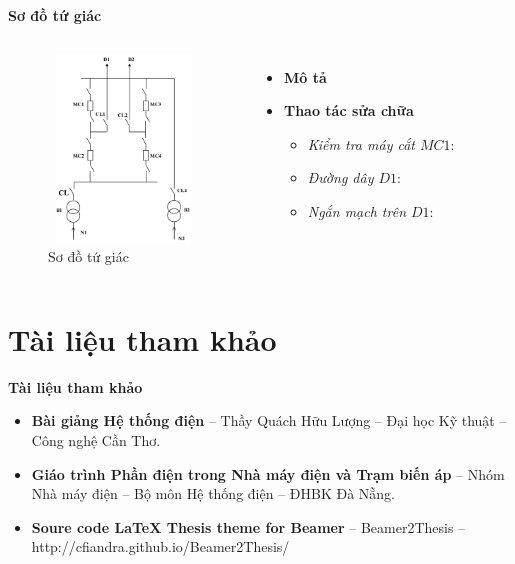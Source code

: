 \documentclass{beamer}
\begin{document}
\begin{frame}{\textbf{Sơ đồ tứ giác}}
\begin{columns}
\begin{figure}[h]
\includegraphics[width=4cm, height=5cm]{tugiac}
\caption{Sơ đồ tứ giác}
\end{figure}

\begin{itemize}
\item \textbf{Mô tả}
\item  \textbf{Thao tác sửa chữa}
\begin{itemize}
\item<1-> \emph{Kiểm tra máy cắt $MC1$}: 
\item<1-> \emph{Đường dây $D1$}: 
\item<1-> \emph{Ngắn mạch trên $D1$}: 
\end{itemize}
\end{itemize}
\end{columns}
\end{frame}
\section{Tài liệu tham khảo}
\begin{frame}{\textbf{Tài liệu tham khảo}}
\begin{itemize}
\item \textbf{Bài  giảng Hệ thống điện} -- Thầy Quách Hữu Lượng -- Đại học Kỹ thuật -- Công nghệ Cần Thơ.
\item \textbf{Giáo trình Phần điện trong Nhà máy điện và Trạm biến áp} -- Nhóm Nhà máy điện -- Bộ môn Hệ thống điện -- ĐHBK Đà Nẵng.
\item \textbf{Soure code \LaTeX{} Thesis theme for Beamer} -- Beamer2Thesis -- \textsf{http://cfiandra.github.io/Beamer2Thesis/}
\end{itemize}
\end{frame}
\end{document}
